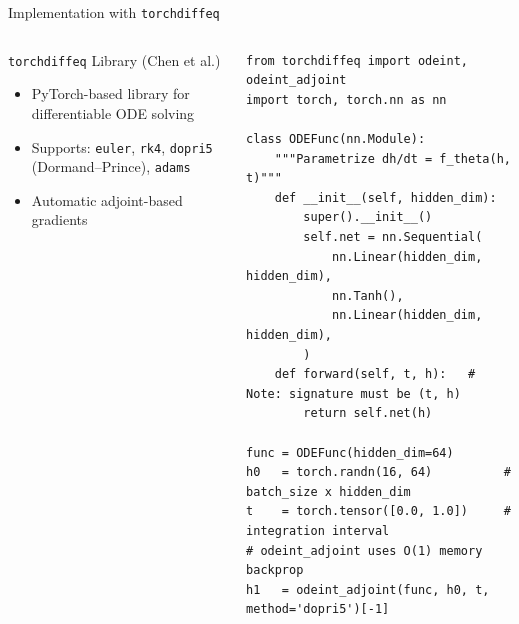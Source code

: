 \documentclass[aspectratio=169,xcolor=dvipsnames,svgnames,x11names,fleqn]{beamer}
\begin{document}
\begin{frame}[fragile]{Implementation with \texttt{torchdiffeq}}
\scriptsize

\begin{columns}




\begin{tblockFrost}{\texttt{torchdiffeq} Library (Chen et al.)}
\begin{itemize}
  \item PyTorch-based library for differentiable ODE solving
  \item Supports: \texttt{euler}, \texttt{rk4}, \texttt{dopri5} (Dormand–Prince), \texttt{adams}
  \item Automatic adjoint-based gradients
\end{itemize}
\end{tblockFrost}




\begin{verbatim}
from torchdiffeq import odeint, odeint_adjoint
import torch, torch.nn as nn
 
class ODEFunc(nn.Module):
    """Parametrize dh/dt = f_theta(h, t)"""
    def __init__(self, hidden_dim):
        super().__init__()
        self.net = nn.Sequential(
            nn.Linear(hidden_dim, hidden_dim),
            nn.Tanh(),
            nn.Linear(hidden_dim, hidden_dim),
        )
    def forward(self, t, h):   # Note: signature must be (t, h)
        return self.net(h)
 
func = ODEFunc(hidden_dim=64)
h0   = torch.randn(16, 64)          # batch_size x hidden_dim
t    = torch.tensor([0.0, 1.0])     # integration interval
# odeint_adjoint uses O(1) memory backprop
h1   = odeint_adjoint(func, h0, t, method='dopri5')[-1]
\end{verbatim}

\end{columns}

\end{frame}
 
\end{document}
